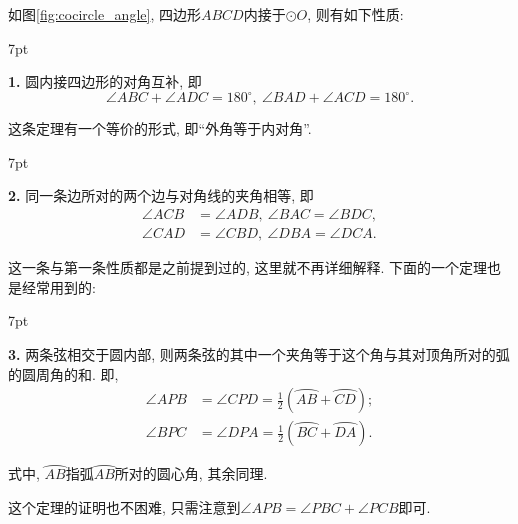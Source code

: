 \documentclass{book}
\newenvironment{theorem}{%
\def\FrameCommand{%
\hspace{1pt}%
{\color{cyan!60!blue}\vrule width 2pt}%
{\color{cyan!10}\vrule width 4pt}%
\colorbox{cyan!10}%
}%
\MakeFramed{\advance\hsize-\width\FrameRestore}%
\noindent\hspace{-4.55pt}%
\begin{adjustwidth}{}{7pt}%
\vspace{2pt}\vspace{2pt}%
}
{%
\vspace{2pt}\end{adjustwidth}\endMakeFramed%
}
\begin{document}
\begin{paracol}{2}
如图\ref{fig:cocircle_angle}, 四边形$ABCD$内接于$\odot O$, 则有如下性质:
\begin{theorem}
	\textbf{1. }{\kaishu 圆内接四边形的对角互补, 即}
	\[\angle ABC+\angle ADC=180^\circ,\ \angle BAD+\angle ACD=180^\circ.\]
\end{theorem}
这条定理有一个等价的形式, 即“外角等于内对角”.
\begin{theorem}
	\textbf{2. }{\kaishu 同一条边所对的两个边与对角线的夹角相等, 即}
	\begin{align*}
		\angle ACB&=\angle ADB,\ \angle BAC=\angle BDC,\\
		\angle CAD&=\angle CBD,\ \angle DBA=\angle DCA.
	\end{align*}                                                                                                                                                                                                        
\end{theorem}
这一条与第一条性质都是之前提到过的, 这里就不再详细解释. 下面的一个定理也是经常用到的:
\begin{theorem}
	\textbf{3. }{\kaishu 两条弦相交于圆内部, 则两条弦的其中一个夹角等于这个角与其对顶角所对的弧的圆周角的和. 即,}
	\begin{align*}
		\angle APB&=\angle CPD=\frac{1}{2}\left(\wideparen{AB}+\wideparen{CD}\right);\\
		\angle BPC&=\angle DPA=\frac{1}{2}\left(\wideparen{BC}+\wideparen{DA}\right).
	\end{align*}
\end{theorem}

式中, $\wideparen{AB}$指弧$\wideparen{AB}$所对的圆心角, 其余同理.\par
这个定理的证明也不困难, 只需注意到$\angle APB=\angle PBC+\angle PCB$即可.


\end{paracol}
\end{document}
